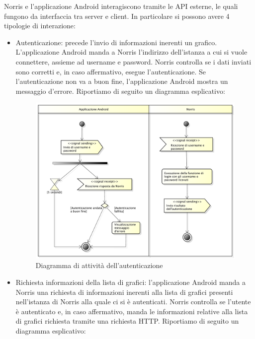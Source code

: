         Norris e l'applicazione Android interagiscono tramite le API esterne, le quali fungono da interfaccia tra server e client. In particolare si possono avere 4 tipologie di interazione:
        \begin{itemize}
            \item Autenticazione: precede l'invio di informazioni inerenti un grafico. L'applicazione Android manda a Norris l'indirizzo dell'istanza a cui si vuole connettere, assieme ad username e password. Norris controlla se i dati inviati sono corretti e, in caso affermativo, esegue l'autenticazione. Se l'autenticazione non va a buon fine, l'applicazione Android mostra un messaggio d'errore. Riportiamo di seguito un diagramma esplicativo:
        	\begin{figure}[H]\centering
        		\includegraphics[width=\textwidth]{SpecificaTecnica/Pics/Applicazione/Autenticazione.pdf}
        		\caption{Diagramma di attività dell'autenticazione}
    		\end{figure}
            \item Richiesta informazioni della lista di grafici: l'applicazione Android manda a Norris una richiesta di informazioni inerenti alla lista di grafici presenti nell'istanza di Norris alla quale ci si è autenticati. Norris controlla se l'utente è autenticato e, in caso affermativo, manda le informazioni relative alla lista di grafici richiesta tramite una richiesta HTTP. Riportiamo di seguito un diagramma esplicativo:
            \begin{figure}[H]\centering

\end{figure}
\end{itemize}
